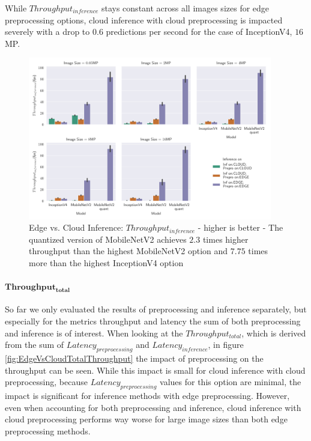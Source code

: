While $Throughput_{inference}$ stays constant across all images sizes for edge preprocessing options, cloud inference with cloud preprocessing is impacted severely with a drop to $0.6$ predictions per second for the case of InceptionV4, $16$MP.


\begin{figure}[!htb]
\centering
\includegraphics[width=0.95\textwidth]{./Bilder/single_plots/edge_vs_cloud_plots/Edge_vs_Cloud_Inference_Throughput_without_Preprocessing.pdf}
\caption[Edge vs. Cloud Inference:  $Throughput_{inference}$ - higher is better]{Edge vs. Cloud Inference:  $Throughput_{inference}$ - higher is better -
The quantized version of MobileNetV2 achieves $2.3$ times higher throughput than the highest MobileNetV2 option and $7.75$ times more than the highest InceptionV4 option}
\label{fig:EdgeVsCloudinferneceThroughput}
\end{figure}

\paragraph{$\mathbf{Throughput_{total}}$}
So far we only evaluated the results of preprocessing and inference separately, but especially for the metrics throughput and latency the sum of both preprocessing and inference is of interest.%
When looking at the $Throughput_{total}$, which is derived from the sum of $Latency_{preprocessing}$ and $Latency_{inference}$, in figure \ref{fig:EdgeVsCloudTotalThroughput} the impact of preprocessing on the throughput can be seen.
While this impact is small for cloud inference with cloud preprocessing, because $Latency_{preprocessing}$ values for this option are minimal, the impact is significant for inference methods with edge preprocessing.
However, even when accounting for both preprocessing and inference, cloud inference with cloud preprocessing performs way worse for large image sizes than both edge preprocessing methods.

